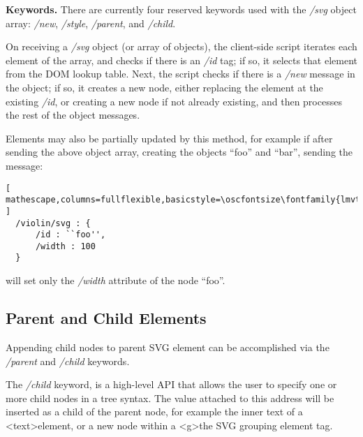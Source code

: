 
\medskip
\noindent
\textbf{Keywords.} 
There are currently four reserved keywords used with the \textit{/svg} object array: \textit{/new}, \textit{/style}, \textit{/parent}, and \textit{/child}.

On receiving a \textit{/svg} object (or array of objects), the client-side script iterates each element of the array, and checks if there is an \textit{/id} tag; if so, it selects that element from the DOM lookup table.
Next, the script checks if there is a \textit{/new} message in the object; if so, it creates a new node, either replacing the element at the existing \textit{/id}, or creating a new node if not already existing, and then processes the rest of the object messages.

Elements may also be partially updated by this method, for example if after sending the above object array, creating the objects ``foo'' and ``bar'', sending the message:

\begin{minipage}{\linewidth}
\begin{lstlisting}[ mathescape,columns=fullflexible,basicstyle=\oscfontsize\fontfamily{lmvtt}\selectfont ]
  /violin/svg : {
      /id : ``foo'',
      /width : 100
  }
  \end{lstlisting}
\end{minipage}

\noindent
will set only the \textit{/width} attribute of the node ``foo''.

\subsection{Parent and Child Elements}\label{sec:parent}
Appending child nodes to parent SVG element can be accomplished via the \textit{/parent} and \textit{/child} keywords.

The \textit{/child} keyword, is a high-level API that allows the user to specify one or more child nodes in a tree syntax.
The value attached to this address will be inserted as a child of the parent node, for example the inner text of a \textless text\textgreater element, or a new node within a \textless g\textgreater the SVG grouping element tag.

